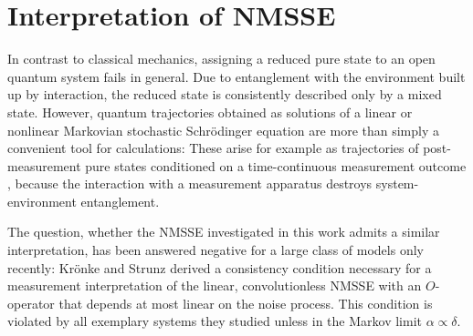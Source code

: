 \section{Interpretation of NMSSE}
\label{sec:nmqsd.interpretation}
%


In contrast to classical mechanics, assigning a reduced pure state to an open quantum system fails in general.
Due to entanglement with the environment built up by interaction, the reduced state is consistently described only by a mixed state.
However, quantum trajectories obtained as solutions of a linear or nonlinear Markovian stochastic Schrödinger equation are more than simply a convenient tool for calculations:
These arise for example as trajectories of post-measurement pure states conditioned on a time-continuous measurement outcome \cite{Ca93_quantum_optics,BaGr09_trajectories}, because the interaction with a measurement apparatus destroys system-environment entanglement.

The question, whether the NMSSE investigated in this work admits a similar interpretation, has been answered negative for a large class of models only recently:
Krönke and Strunz \cite{KrSt12_trajectories} derived a consistency condition necessary for a measurement interpretation of the linear, convolutionless NMSSE with an $O$-operator that depends at most linear on the noise process.
This condition is violated by all exemplary systems they studied unless in the Markov limit $\alpha\propto\delta$.\\

